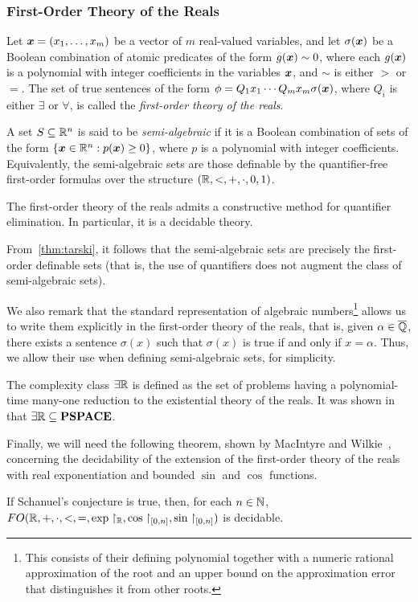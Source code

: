 \subsubsection{First-Order Theory of the Reals}

Let $\boldsymbol{x}=(x_1,\ldots,x_m)$ be a vector of $m$ real-valued
variables, and let $\sigma(\boldsymbol{x})$ be a Boolean combination
of atomic predicates of the form $g(\boldsymbol{x})\sim 0$, where each
$g(\boldsymbol{x})$ is a polynomial with integer coefficients in the
variables $\boldsymbol{x}$, and $\sim$ is either $>$ or $=$.
The set of true sentences of the form $\phi=Q_1 x_1 \cdots Q_m x_m
\sigma(\boldsymbol{x})$, where $Q_i$ is either $\exists$ or
$\forall$, is called the \emph{first-order theory of the reals}.

A set $S \subseteq \mathbb{R}^{n}$ is said to be \emph{semi-algebraic} if it is a Boolean combination of sets of the form $\lbrace \boldsymbol{x} \in \mathbb{R}^{n}: p(\boldsymbol{x}) \geq 0\rbrace$, where $p$ is a polynomial with integer coefficients. Equivalently, the semi-algebraic sets are those definable by the quantifier-free first-order formulas over the structure $(\mathbb{R}, <, +, \cdot, 0, 1)$.

\begin{theorem}
\label{thm:tarski}
The first-order theory of the reals admits a constructive method for quantifier elimination. In particular, it is a decidable theory.~\cite{Tar51}
\end{theorem}

From~\cref{thm:tarski}, it follows that the semi-algebraic sets are precisely the first-order definable sets (that is, the use of quantifiers does not augment the class of semi-algebraic sets).

We also remark that the standard representation of algebraic numbers\footnote{This consists of their defining polynomial together with a numeric rational approximation of the root and an upper bound on the approximation error that distinguishes it from other roots.} allows us to write them explicitly in the first-order theory of the reals, that is, given $\alpha\in\overline{\mathbb{Q}}$, there exists a sentence $\sigma(x)$ such that $\sigma(x)$ is true if and only if $x=\alpha$. Thus, we allow their use when defining semi-algebraic sets, for simplicity.

The complexity class $\exists\mathbb{R}$ is defined as the set of problems having a polynomial-time many-one reduction to the existential theory of the reals. It was shown in~\cite{Canny88} that $\exists\mathbb{R}\subseteq \textbf{PSPACE}$.

Finally, we will need the following theorem, shown by MacIntyre and Wilkie~\cite{WM}, concerning the decidability of the extension of the first-order theory of the reals with real exponentiation and bounded $\sin$ and $\cos$ functions.
\begin{theorem}
\label{thm:wilkie-macintyre}
  If Schanuel's conjecture is true, then, for each $n \in \mathbb{N}$,
  $FO(\mathbb{R}, +, \cdot, <, =, \exp \restriction_{\mathbb{R}}, \cos\restriction_{[0, n]}, \sin\restriction_{[0,n]})$ is decidable.
\end{theorem}
